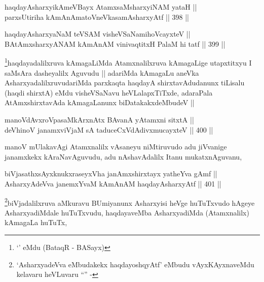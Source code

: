 
\begin{shl}
haqdayAsharxyikAmeVBayx AtamxsaMsharxyiNAM yataH || \\
parxsUtiriha kAmAnAmatoV\s neVkasamAsharxyAtf ||  398 ||  
\end{shl}
				
\begin{shl}
haqdayAsharxyaNaM teVSAM visheVSaNamihoVcayxteV || \\
BAtAmxsharxyANAM kAmAnAM vinivaqtitxH PalaM hi tatf ||  399 ||  
\end{shl}

\begin{artha} 
\footnote{`\stext' eMdu (BataqR - BASayx)}haqdayadalilxruva kAmagaLiMda Atamxnalilxruva kAmagaLige
utapxtitxyu I saMsAra dasheyalilx Aguvudu || adariMda kAmagaLu aneVka
AsharxyadalilxruvudariMda parxkaqta haqdayA shirxtavAdudanunx tiLisalu
(haqdi shirxtA) eMdu visheVSaNavu heVLalapxTiTxde, adaraPala
AtAmxshirxtavAda kAmagaLanunx biDatakakxdeMbudeV ||
\end{artha}

\begin{shl}
manoVdAvxroVpasaMkArxnAtx BAvanA yA\s \s tamxni sitxtA || \\
deVhinoV janamxviVjaM sA taduceCxVdAdivxmucayxteV ||  400 ||  
\end{shl}

\begin{artha}
manoV mUlakavAgi Atamxnalilx vAsaneyu niMtiruvudo adu jiVvanige
janamxkekx kAraNavAguvudu, adu nAshavAdalilx Itanu mukatxnAguvanu,
\end{artha}


\begin{shl}
biVjasathxsAyxknukxraseyxVha janAmx\s \s shirxtayx yatheYva gAmf || \\
AsharxyAdeVva janemxYvaM kAmAnAM haqdayAsharxyAtf ||  401 ||  
\end{shl}

\begin{artha}
\footnote{`AsharxyadeVva eMbudakekx haqdayoshqyAtf' eMbudu
  vAyxKAyxnaveMdu kelavaru heVLuvaru ``\stext'' -}biVjadalilxruva aMkuravu BUmiyanunx Asharxyisi heVge
huTuTxvudo hAgeye AsharxyadiMdale huTuTxvudu, haqdayaveMba
AsharxyadiMda (Atamxnalilx) kAmagaLa huTuTx,
\end{artha}

